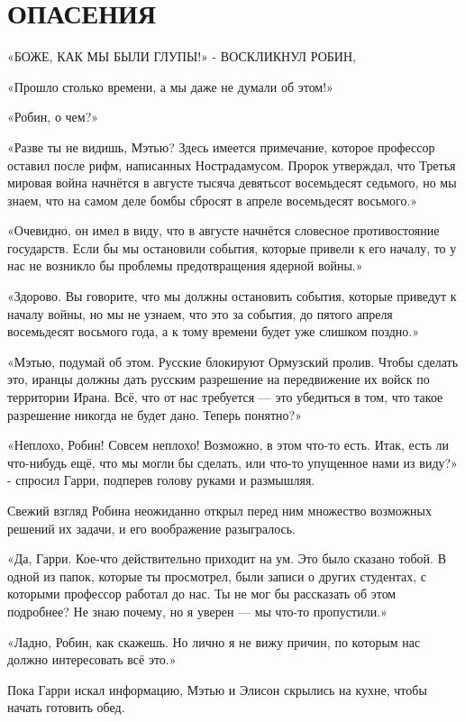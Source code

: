 \documentclass[a4paper,12pt]{book}
\begin{document}
\chapter{ОПАСЕНИЯ}
\noindent\par«БОЖЕ, КАК МЫ БЫЛИ ГЛУПЫ!» - ВОСКЛИКНУЛ РОБИН,
\par
«Прошло столько времени, а мы даже не думали об этом!»
\par
«Робин, о чем?»
\par
«Разве ты не видишь, Мэтью? Здесь имеется примечание, которое профессор оставил после рифм, написанных Нострадамусом. Пророк утверждал, что Третья мировая война начнётся в августе тысяча девятьсот восемьдесят седьмого, но мы знаем, что на самом деле бомбы сбросят в апреле восемьдесят восьмого.»
\par
«Очевидно, он имел в виду, что в августе начнётся словесное противостояние государств. Если бы мы остановили события, которые привели к его началу, то у нас не возникло бы проблемы предотвращения ядерной войны.»
\par
«Здорово. Вы говорите, что мы должны остановить события, которые приведут к началу войны, но мы не узнаем, что это за события, до пятого апреля восемьдесят восьмого года, а к тому времени будет уже слишком поздно.»
\par
«Мэтью, подумай об этом. Русские блокируют Ормузский пролив. Чтобы сделать это, иранцы должны дать русским разрешение на передвижение их войск по территории Ирана. Всё, что от нас требуется — это убедиться в том, что такое разрешение никогда не будет дано. Теперь понятно?»
\par
«Неплохо, Робин! Совсем неплохо! Возможно, в этом что-то есть. Итак, есть ли что-нибудь ещё, что мы могли бы сделать, или что-то упущенное нами из виду?» - спросил Гарри, подперев голову руками и размышляя.
\par
Свежий взгляд Робина неожиданно открыл перед ним множество возможных решений их задачи, и его воображение разыгралось.
\par
«Да, Гарри. Кое-что действительно приходит на ум. Это было сказано тобой. В одной из папок, которые ты просмотрел, были записи о других студентах, с которыми профессор работал до нас. Ты не мог бы рассказать об этом подробнее? Не знаю почему, но я уверен — мы что-то пропустили.»
\par
«Ладно, Робин, как скажешь. Но лично я не вижу причин, по которым нас должно интересовать всё это.»
\par
Пока Гарри искал информацию, Мэтью и Элисон скрылись на кухне, чтобы начать готовить обед.
\end{document}
